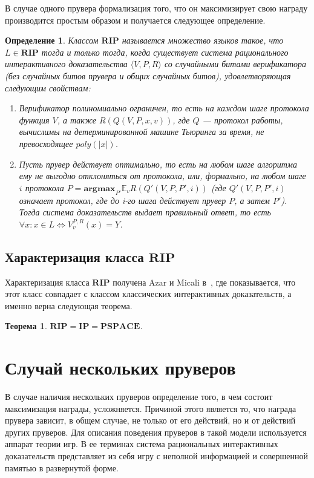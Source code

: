 \documentclass[14pt, a4paper]{extreport}
\newtheorem{theorem}{\indent Теорема}
\newtheorem{definition}{\indent Определение}
\newcommand{\poly}{\textit{poly}}
\begin{document}
В случае одного прувера формализация того, что он максимизирует свою награду производится простым образом и получается следующее определение.
\begin{definition}\label{rip}
    Классом $\textbf{RIP}$ называется множество языков такое, что $L \in \textbf{RIP}$ тогда и только тогда, когда существует система рационального интерактивного доказательства $\langle V, P, R\rangle$ со случайными битами верификатора (без случайных битов прувера и общих случайных битов), удовлетворяющая следующим свойствам:
    \begin{enumerate}
        \item Верификатор полиномиально ограничен, то есть на каждом шаге протокола функция $V$, а также $R(Q(V, P, x, v))$, где $Q$ --- протокол работы, вычислимы на детерминированной машине Тьюринга за время, не превосходящее $\poly(|x|)$.
        \item Пусть прувер действует оптимально, то есть на любом шаге алгоритма ему не выгодно отклоняться от протокола, или, формально, на любом шаге $i$ протокола $P = \textbf{argmax}_{P'} \mathbb{E}_v R(Q'(V, P, P', i))$ (где $Q'(V, P, P', i)$ означает протокол, где до i-го шага действует прувер $P$, а затем $P'$). Тогда система доказательств выдает правильный ответ, то есть $\forall x: x \in L \iff V^{P, R}_{v}(x) = Y$.
        \end{enumerate}
    \end{definition}

    \section{Характеризация класса $\textbf{RIP}$}
    Характеризация класса $\textbf{RIP}$ получена Azar и Micali в~\cite{azar2012rational}, где показывается, что этот класс совпадает с классом классических интерактивных доказательств, а именно верна следующая теорема.
    \begin{theorem}
        $\textbf{RIP} = \textbf{IP} = \textbf{PSPACE}$.
    \end{theorem}
        \chapter{Случай нескольких пруверов}
        В случае наличия нескольких пруверов определение того, в чем состоит максимизация награды, усложняется. Причиной этого является то, что награда прувера зависит, в общем случае, не только от его действий, но и от действий других пруверов. Для описания поведения пруверов в такой модели используется аппарат теории игр. В ее терминах система рациональных интерактивных доказательств представляет из себя игру с неполной информацией и совершенной памятью в развернутой форме.
\end{document}

